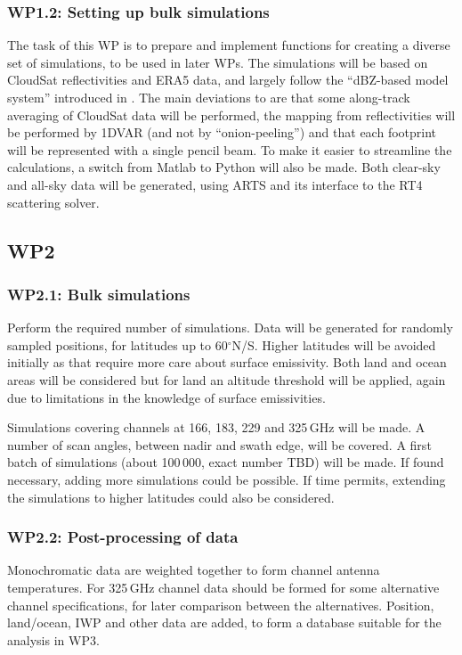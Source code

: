 \documentclass[BCOR=1cm,12pt,bibliography=totoc]{article}
\begin{document}
\subsubsection*{WP1.2: Setting up bulk simulations}
%
The task of this WP is to prepare and implement functions for creating a
diverse set of simulations, to be used in later WPs. The simulations will be
based on CloudSat reflectivities and ERA5 data, and largely follow the
``dBZ-based model system'' introduced in \citet{ekelund:using:20}. The main
deviations to \citet{ekelund:using:20} are that some along-track averaging of
CloudSat data will be performed, the mapping from reflectivities will be
performed by 1DVAR (and not by ``onion-peeling'') and that each footprint will
be represented with a single pencil beam. To make it easier to streamline the
calculations, a switch from Matlab to Python will also be made. Both clear-sky
and all-sky data will be generated, using ARTS and its interface to the RT4
scattering solver.


\subsection*{WP2}
%
\subsubsection*{WP2.1: Bulk simulations}
%
Perform the required number of simulations. Data will be generated for randomly
sampled positions, for latitudes up to  60$^\circ$N/S. Higher latitudes
will be avoided initially as that require more care about surface emissivity.
Both land and ocean areas will be considered but for land an altitude threshold
will be applied, again due to limitations in the knowledge of surface
emissivities. 

Simulations covering channels at 166, 183, 229 and 325\,GHz will be made. A
number of scan angles, between nadir and swath edge, will be covered. A first
batch of simulations (about 100\,000, exact number TBD) will be made. If found
necessary, adding more simulations could be possible. If time permits,
extending the simulations to higher latitudes could also be considered.


\subsubsection*{WP2.2: Post-processing of data}
%
Monochromatic data are weighted together to form channel antenna temperatures.
For 325\,GHz channel data should be formed for some alternative channel
specifications, for later comparison between the alternatives. Position,
land/ocean, IWP and other data are added, to form a database suitable for the
analysis in WP3. 
\end{document}
